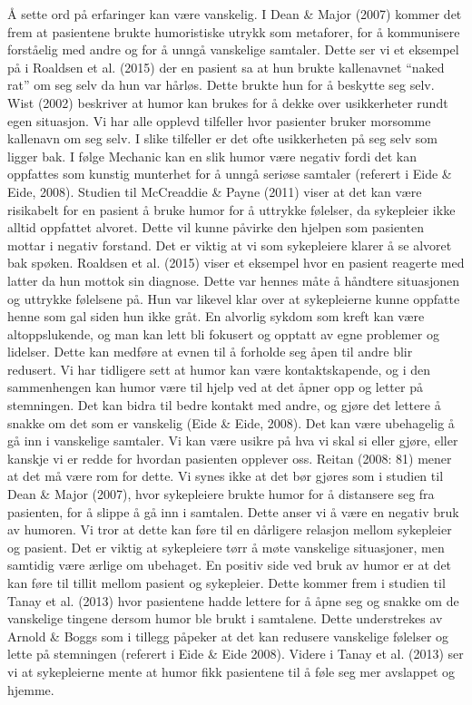 Å sette ord på erfaringer kan være vanskelig. I Dean \&{} Major (2007) kommer det
frem at pasientene brukte humoristiske utrykk som metaforer, for å kommunisere
forståelig med andre og for å unngå vanskelige samtaler. Dette ser vi et
eksempel på i Roaldsen et al. (2015) der en pasient sa at hun brukte
kallenavnet “naked rat” om seg selv da hun var hårløs. Dette brukte hun for å
beskytte seg selv. Wist (2002) beskriver at humor kan brukes for å dekke over
usikkerheter rundt egen situasjon. Vi har alle opplevd tilfeller hvor pasienter
bruker morsomme kallenavn om seg selv. I slike tilfeller er det ofte
usikkerheten på seg selv som ligger bak. I følge Mechanic kan en slik humor
være negativ fordi det kan oppfattes som kunstig munterhet for å unngå seriøse
samtaler (referert i Eide \&{} Eide, 2008). Studien til McCreaddie \&{} Payne (2011)
viser at det kan være risikabelt for en pasient å bruke humor for å uttrykke
følelser, da sykepleier ikke alltid oppfattet alvoret. Dette vil kunne påvirke
den hjelpen som pasienten mottar i negativ forstand. Det er viktig at vi som
sykepleiere klarer å se alvoret bak spøken. Roaldsen et al. (2015) viser et
eksempel hvor en pasient reagerte med latter da hun mottok sin diagnose. Dette
var hennes måte å håndtere situasjonen og uttrykke følelsene på. Hun var
likevel klar over at sykepleierne kunne oppfatte henne som gal siden hun ikke
gråt.  En alvorlig sykdom som kreft kan være altoppslukende, og man kan lett
bli fokusert og opptatt av egne problemer og lidelser. Dette kan medføre at
evnen til å forholde seg åpen til andre blir redusert. Vi har tidligere sett at
humor kan være kontaktskapende, og i den sammenhengen kan humor være til hjelp
ved at det åpner opp og letter på stemningen. Det kan bidra til bedre kontakt
med andre, og gjøre det lettere å snakke om det som er vanskelig (Eide \&{} Eide,
2008).  Det kan være ubehagelig å gå inn i vanskelige samtaler. Vi kan være
usikre på hva vi skal si eller gjøre, eller kanskje vi er redde for hvordan
pasienten opplever oss. Reitan (2008: 81) mener at det må være rom for dette.
Vi synes ikke at det bør gjøres som i studien til Dean \&{} Major (2007), hvor
sykepleiere brukte humor for å distansere seg fra pasienten, for å slippe å gå
inn i samtalen. Dette anser vi å være en negativ bruk av humoren. Vi tror at
dette kan føre til en dårligere relasjon mellom sykepleier og pasient. Det er
viktig at sykepleiere tørr å møte vanskelige situasjoner, men samtidig være
ærlige om ubehaget.  En positiv side ved bruk av humor er at det kan føre til
tillit mellom pasient og sykepleier. Dette kommer frem i studien til Tanay et
al. (2013) hvor pasientene hadde lettere for å åpne seg og snakke om de
vanskelige tingene dersom humor ble brukt i samtalene. Dette understrekes av
Arnold \&{} Boggs som i tillegg påpeker at det kan redusere vanskelige følelser og
lette på stemningen (referert i Eide \&{} Eide 2008). Videre i Tanay et al. (2013)
ser vi at sykepleierne mente at humor fikk pasientene til å føle seg mer
avslappet og hjemme.

